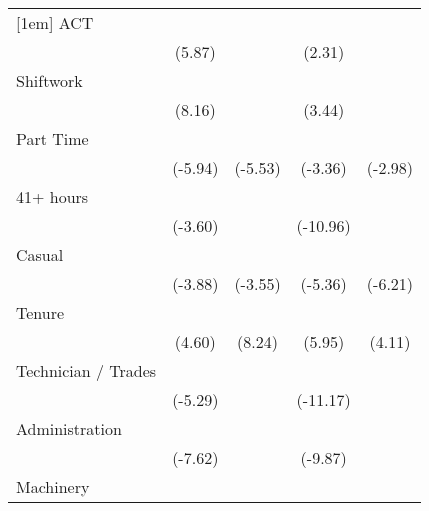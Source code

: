 {\begin{tabular}{l*{4}{c}}
[1em]
ACT                 &            \sym{***}&                     &            \sym{*}  &                     \\
                    &      (5.87)         &                     &      (2.31)         &                     \\
[1em]
Shiftwork           &            \sym{***}&                     &            \sym{***}&                     \\
                    &      (8.16)         &                     &      (3.44)         &                     \\
[1em]
Part Time           &            \sym{***}&            \sym{***}&            \sym{***}&            \sym{**} \\
                    &     (-5.94)         &     (-5.53)         &     (-3.36)         &     (-2.98)         \\
[1em]
41+ hours           &            \sym{***}&                     &            \sym{***}&                     \\
                    &     (-3.60)         &                     &    (-10.96)         &                     \\
[1em]
Casual              &            \sym{***}&            \sym{***}&            \sym{***}&            \sym{***}\\
                    &     (-3.88)         &     (-3.55)         &     (-5.36)         &     (-6.21)         \\
[1em]
Tenure              &            \sym{***}&            \sym{***}&            \sym{***}&            \sym{***}\\
                    &      (4.60)         &      (8.24)         &      (5.95)         &      (4.11)         \\
[1em]
Technician / Trades &            \sym{***}&                     &            \sym{***}&                     \\
                    &     (-5.29)         &                     &    (-11.17)         &                     \\
[1em]
Administration      &            \sym{***}&                     &            \sym{***}&                     \\
                    &     (-7.62)         &                     &     (-9.87)         &                     \\
[1em]
Machinery           &            \sym{***}&                     &            \sym{***}&                     \\

\end{tabular}}
